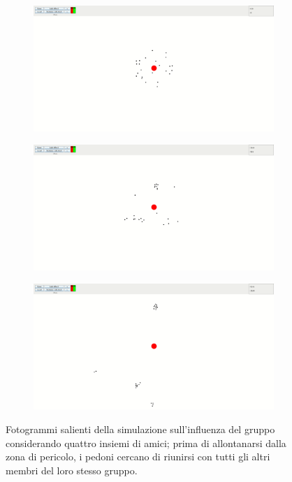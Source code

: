 \begin{figure}
    \centering
    \begin{subfigure}[b]{0.75\textwidth}
        \centering
        \includegraphics[width=\textwidth]{immagini/casi-studio/influence-with-groups-begin.png}
    \end{subfigure}
    \hfill
    \begin{subfigure}[b]{0.75\textwidth}
        \centering
        \includegraphics[width=\textwidth]{immagini/casi-studio/influence-with-groups-during.png}
    \end{subfigure}
    \hfill
    \begin{subfigure}[b]{0.75\textwidth}
        \centering
        \includegraphics[width=\textwidth]{immagini/casi-studio/influence-with-groups-end.png}
    \end{subfigure}
    \caption{Fotogrammi salienti della simulazione sull'influenza del gruppo considerando quattro insiemi di amici; prima di allontanarsi dalla zona di pericolo, i pedoni cercano di riunirsi con tutti gli altri membri del loro stesso gruppo.}
    \label{fig:influence-with-groups}
\end{figure}